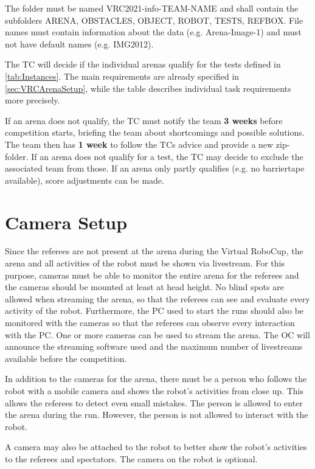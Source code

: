 The folder must be named VRC2021-info-TEAM-NAME and shall contain the subfolders ARENA, OBSTACLES, OBJECT, ROBOT, TESTS, REFBOX. 
File names must contain information about the data (e.g. Arena-Image-1) and must not have default names (e.g. IMG2012).

The TC will decide if the individual arenas qualify for the tests defined in \ref{tab:Instances}. 
The main requirements are already specified in \ref{sec:VRCArenaSetup}, while the table describes individual task requirements more precisely.
 
If an arena does not qualify, the TC must notify the team \textbf{3 weeks} before competition starts, 
briefing the team about shortcomings and possible solutions. 
The team then has \textbf{1 week} to follow the TCs advice and provide a new zip-folder.
If an arena does not qualify for a test, the TC may decide to exclude the associated team from those.
If an arena only partly qualifies (e.g. no barriertape available), score adjustments can be made.


\section{Camera Setup} 
\label{sec:VRCCameraSetup}

Since the referees are not present at the arena during the Virtual RoboCup, the arena and all activities of the robot must be shown via livestream. For this purpose, cameras must be able to monitor the entire arena for the referees and the cameras should be mounted at least at head height. No blind spots are allowed when streaming the arena, so that the referees can see and evaluate every activity of the robot. Furthermore, the PC used to start the runs should also be monitored with the cameras so that the referees can observe every interaction with the PC. One or more cameras can be used to stream the arena. The OC will announce the streaming software used and the maximum number of livestreams available before the competition.
\par
In addition to the cameras for the arena, there must be a person who follows the robot with a mobile camera and shows the robot's activities from close up. This allows the referees to detect even small mistakes. The person is allowed to enter the arena during the run. However, the person is not allowed to interact with the robot.
\par
A camera may also be attached to the robot to better show the robot's activities to the referees and spectators. The camera on the robot is optional.

